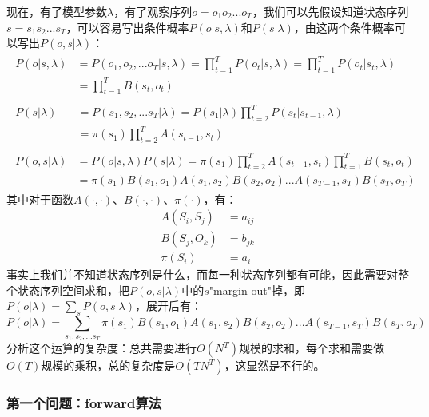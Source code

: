 \documentclass[11pt,a4paper]{article}
\numberwithin{equation}{section}
\begin{document}
现在，有了模型参数$\lambda$，有了观察序列$o=o_1 o_2 ... o_T$，我们可以先假设知道状态序列$s=s_1 s_2 ... s_T$，可以容易写出条件概率$P(o | s, \lambda)$和$P(s | \lambda)$，由这两个条件概率可以写出$P(o, s | \lambda)$：
\begin{align}
\begin{split}
P(o | s, \lambda) 
& = P(o_1, o_2, ... o_T | s, \lambda) = \prod_{t = 1}^T P(o_t | s, \lambda) = \prod_{t = 1}^T P(o_t | s_t, \lambda)\\
& = \prod_{t = 1}^T B(s_t, o_t)
\end{split}
\\
\begin{split}
P(s | \lambda) \quad
& = P(s_1, s_2, ... s_T | \lambda) = P(s_1 | \lambda) \prod_{t = 2}^T P(s_t | s_{t - 1}, \lambda)\\
& = \pi(s_1) \prod_{t = 2}^T A(s_{t - 1}, s_t)
\end{split}
\\
\begin{split}
P(o, s | \lambda)
& = P(o | s, \lambda) P(s | \lambda) = \pi(s_1) \prod_{t = 2}^T A(s_{t - 1}, s_t) \prod_{t = 1}^T B(s_t, o_t)\\
& = \pi(s_1) B(s_1, o_1) A(s_1, s_2) B(s_2, o_2) ... A(s_{T - 1}, s_T) B(s_T, o_T)
\end{split}
\end{align}
其中对于函数$A(\cdot, \cdot)$、$B(\cdot, \cdot)$、$\pi(\cdot)$，有：
\begin{subequations}
\begin{align}
A(S_i, S_j) & = a_{ij}\\
B(S_j, O_k) & = b_{jk}\\
\pi(S_i) & = a_{i}
\end{align}
\end{subequations}
事实上我们并不知道状态序列是什么，而每一种状态序列都有可能，因此需要对整个状态序列空间求和，把$P(o, s | \lambda)$中的$s$"margin out"掉，即$P(o | \lambda) = \sum_s P(o, s| \lambda)$，展开后有：
\begin{equation}\label{P(o|lambda)}
P(o | \lambda) = \sum_{s_1, s_2, ... s_T} \pi(s_1) B(s_1, o_1) A(s_1, s_2) B(s_2, o_2) ... A(s_{T - 1}, s_T) B(s_T, o_T)
\end{equation}
分析这个运算的复杂度：总共需要进行$O(N^T)$规模的求和，每个求和需要做$O(T)$规模的乘积，总的复杂度是$O(TN^T)$，这显然是不行的。

\subsubsection{第一个问题：forward算法}
\end{document}
